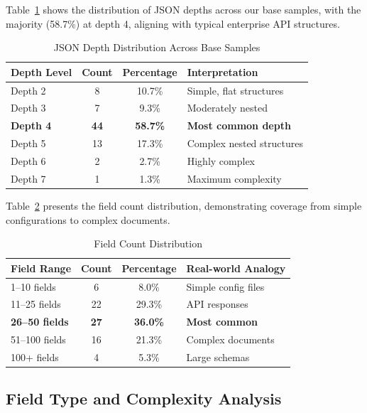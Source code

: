 \documentclass{article}
\begin{document}
Table~\ref{tab:json-depth-appendix} shows the distribution of JSON depths across our base samples, with the majority (58.7\%) at depth 4, aligning with typical enterprise API structures.

\begin{table}[H]
\centering
\caption{JSON Depth Distribution Across Base Samples}
\label{tab:json-depth-appendix}
\begin{tabular}{lccp{5cm}}
\toprule
\textbf{Depth Level} & \textbf{Count} & \textbf{Percentage} & \textbf{Interpretation} \\
\midrule
Depth 2 & 8 & 10.7\% & Simple, flat structures \\
Depth 3 & 7 & 9.3\% & Moderately nested \\
\textbf{Depth 4} & \textbf{44} & \textbf{58.7\%} & \textbf{Most common depth} \\
Depth 5 & 13 & 17.3\% & Complex nested structures \\
Depth 6 & 2 & 2.7\% & Highly complex \\
Depth 7 & 1 & 1.3\% & Maximum complexity \\
\bottomrule
\end{tabular}
\end{table}

Table~\ref{tab:field-count-appendix} presents the field count distribution, demonstrating coverage from simple configurations to complex documents.

\begin{table}[H]
\centering
\caption{Field Count Distribution}
\label{tab:field-count-appendix}
\begin{tabular}{lccp{4.5cm}}
\toprule
\textbf{Field Range} & \textbf{Count} & \textbf{Percentage} & \textbf{Real-world Analogy} \\
\midrule
1--10 fields & 6 & 8.0\% & Simple config files \\
11--25 fields & 22 & 29.3\% & API responses \\
\textbf{26--50 fields} & \textbf{27} & \textbf{36.0\%} & \textbf{Most common} \\
51--100 fields & 16 & 21.3\% & Complex documents \\
100+ fields & 4 & 5.3\% & Large schemas \\
\bottomrule
\end{tabular}
\end{table}

\subsection{Field Type and Complexity Analysis}
\label{subsec:field-type-analysis}
\end{document}
